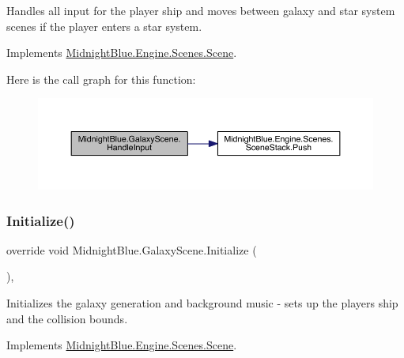 Handles all input for the player ship and moves between galaxy and star system scenes if the player enters a star system. 



Implements \hyperlink{class_midnight_blue_1_1_engine_1_1_scenes_1_1_scene_a2f7849ef8976f9aeed0023448033b6fd}{Midnight\+Blue.\+Engine.\+Scenes.\+Scene}.

Here is the call graph for this function\+:
\nopagebreak
\begin{figure}[H]
\begin{center}
\leavevmode
\includegraphics[width=350pt]{class_midnight_blue_1_1_galaxy_scene_afd7f8c9f6d0cf6ded10299d4b0015c29_cgraph}
\end{center}
\end{figure}
\hypertarget{class_midnight_blue_1_1_galaxy_scene_a97d97e56a73d9a4b7caf6dd6ce86647e}{}\label{class_midnight_blue_1_1_galaxy_scene_a97d97e56a73d9a4b7caf6dd6ce86647e} 
\subsubsection{\texorpdfstring{Initialize()}{Initialize()}}
{\footnotesize\ttfamily override void Midnight\+Blue.\+Galaxy\+Scene.\+Initialize (\begin{DoxyParamCaption}{ }\end{DoxyParamCaption})\hspace{0.3cm}{\ttfamily [inline]}, {\ttfamily [virtual]}}



Initializes the galaxy generation and background music -\/ sets up the players ship and the collision bounds. 



Implements \hyperlink{class_midnight_blue_1_1_engine_1_1_scenes_1_1_scene_aa919101862c14384b955d91a4d3362ab}{Midnight\+Blue.\+Engine.\+Scenes.\+Scene}.

\hypertarget{class_midnight_blue_1_1_galaxy_scene_aeb44afaeda2cccd225e64908bb76bee4}{}\label{class_midnight_blue_1_1_galaxy_scene_aeb44afaeda2cccd225e64908bb76bee4} 
